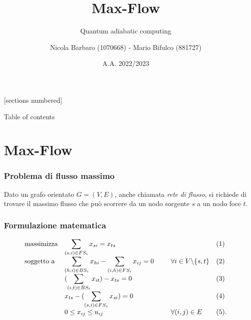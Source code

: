 \documentclass[10pt]{beamer}
\title{Max-Flow}
\subtitle{Quantum adiabatic computing}
\date{A.A. 2022/2023}
\author{Nicola Barbaro (1070668) - Mario Bifulco (881727)}
\institute{Università degli studi di Torino - Ottimizzazione Combinatoria}
\begin{document}
\maketitle

[sections numbered]

\begin{frame}{Table of contents}
  \tableofcontents
\end{frame}

\section{Max-Flow}
\begin{frame}
  \frametitle{Problema di flusso massimo}

  Dato un grafo orientato $G = (V, E)$, anche chiamata \emph{rete di flusso}, 
  si richiede di trovare il massimo flusso che può scorrere da un nodo sorgente $s$ a un nodo foce $t$. 


\end{frame}
\begin{frame}
  \frametitle{Formulazione matematica}

  \begin{equation*}
    \begin{array}{ll@{}ll}
      \text{massimizza}   & \displaystyle\sum_{(s, i) \in FS_{i}} x_{si} = x_{ts} & \;\;\;\;\;\;\;\;\; &(1)\\
      \text{soggetto a}   & \displaystyle\sum_{(h, i) \in BS_{i}} x_{hi} - \sum_{(i, h) \in FS_{i}} x_{ij} = 0 \;\;\;\;\;\;\;\;\; &    \forall i \in V \backslash \{s,t\}&(2)\\
                          & (\displaystyle\sum_{(i, t) \in BS_{t}} x_{it}) - x_{ts} = 0 & &(3)\\
                          &  x_{ts} - (\displaystyle\sum_{(s,i) \in FS_{s}} x_{si}) = 0 & &(4)\\
                          &0 \leq x_{ij} \leq u_{ij} & \forall (i,j) \in E &(5).
    \end{array}
  \end{equation*}

\end{frame}
\end{document}
